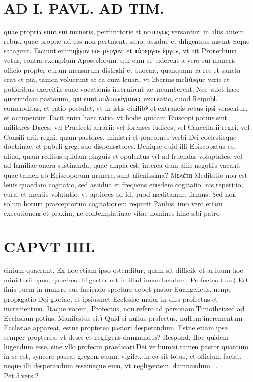 \documentclass{article}
\begin{document}
\begin{pages}
\section*{AD I. PAVL. AD TIM. }
\marginpar{[ p.430 ]}\pstart quae propria sunt sui muneris, perfunctorie et noτιργως versantur: in aliis autem rebus, quae proprie ad eos non pertinent, serio, assidue et diligentius insunt eaque satagunt. Faciunt enimη̃ργον πά- ρεργον: et πάρεργον ἔργον, vt ait Prouerbium vetus, contra exemplum Apostolorum, qui cum se viderent a vero sui muneris officio propter curam mensarum distrahi et auocari, quanquam ea res et sancta erat et pia, tamen voluerunt se ea cura leuari, vt liberius meliûsque veris et potioribus exercitiis suae vocationis inseruirent ac incumberent. Nec valet haec quorundam pastorum, qui sunt πολυπράγμονςς excusatio, quod Reipubl. commoditas, et ratio postulet, vt in istis ciuilibꝰ et extraneis rebus ipsi versentur, et occupentur. Facit enim haec ratio, vt hodie quidam Episcopi potius sint militares Duces, vel Praefecti aerarii: vel forenses iudices, vel Cancellarii regni, vel Consili arii, regni, quam pastores, ministri et praecones verbi Dei coelestisque doctrinae, et pabuli gregi suo dispensatores. Denique quid illi Episcopatus est aliud, quam reditus quidam pinguis et opulentus vel ad fruendas voluptates, vel ad familiae onera sustinenda, quae ampla est, interea dum aliis negotiis vacant, quae tamen ab Episcoporum munere, sunt alienissima? Μελέτα Meditatio non est leuis quaedam cogitatio, sed assidua et frequens eiusdem cogitatio. nis repetitio, cura, et mentis volutatio, vt aptiores ad id, quod meditamur, fiamus. Sed non solum horum praeceptorum cogitationem requirit Paulus, imo vero etiam executionem et praxim, ne contemplatiuae vitae homines hinc sibi patro\pend
\section*{CAPVT  IIII. }
\marginpar{[ p.237 ]}\pstart cinium quaerant. Ex hoc etiam ipso ostenditur, quam sit difficile et arduum hoc ministerii opus, quocirca diligenter est in illud incumbendum. Profectus tuus) Est finis quem in munere suo faciendo spectare debet pastor Euangelicus, nenpe propagatio Dei gloriae, et ipsiusmet Ecclesiae maior in dies profectus et incrementum. Itaque vocem, Profectus, non refero ad personam Timothei:sed ad Ecclesiam potius, Manifestus sit) Quid si nullus profectus, nulIum incrementum Ecclesiae appareat, estne propterea pastori desperandum. Estne etiam ipse semper propterea, vt deses et negligens damnandus? Respond. Hoc quidem lugendum esse, sine vllo profectu praedicari Dei verbum:si tamen pastor quantum in se est, syncere pascat gregem suum, vigilet, in eo sit totus, et officium faciat, neque illi desperandum esse:neque eum, vt negligentem, damnandum 1. Pet.5.vers.2.  \pend\pstart {}
{}

\end{pages}
\end{document}
